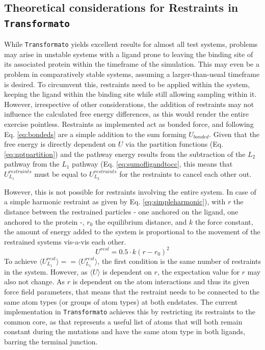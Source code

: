 \documentclass[oneside]{scrreprt}
\begin{document}
\subsection{Theoretical considerations for Restraints in \texttt{Transformato}}
While \texttt{Transformato} yields excellent results for almost all test systems, problems may arise in unstable systems with a ligand prone to leaving the binding site of its associated protein within the timeframe of the simulation. This may even be a problem in comparatively stable systems, assuming a larger-than-usual timeframe is desired. To circumvent this, restraints need to be applied within the system, keeping the ligand within the binding site while still allowing sampling within it. However, irrespective of other considerations, the addition of restraints may not influence the calculated free energy differences, as this would render the entire exercise pointless. Restraints as implemented act as bonded force, and following Eq. \ref{eq:bondeds} are a simple addition to the sum forming $U_{bonded}$. Given that the free energy is directly dependent on $U$ via the partition functions (Eq. \ref{eq:nptpartition}) and the pathway energy results from the subtraction of the $L_2$ pathway from the $L_1$ pathway (Eq. \ref{eq:sumofligandtocc}, this means that $U^{restraints}_{L_1}$ must be equal to $U^{restraints}_{L_2}$ for the restraints to cancel each other out.

However, this is not possible for restraints involving the entire system. In case of a simple harmonic restraint as given by Eq. \ref{eq:simpleharmonic}), with $r$ the distance between the restrained particles - one anchored on the ligand, one anchored to the protein -, $r_0$ the equilibrium distance, and $k$ the force constant,  the amount of energy added to the system is proportional to the movement of the restrained systems vis-a-vis each other.
\begin{equation}\label{eq:simpleharmonic}
    U^{rest}=0.5\cdot k(r-r_0)^2 
\end{equation}
To achieve $\langle U^{rest}_{L_1}\rangle == \langle U^{rest}_{L_1}\rangle$, the first condition is the same number of restraints in the system. However, as $\langle U \rangle$ is dependent on $r$, the expectation value for $r$ may also not change. As $r$ is dependent on the atom interactions and thus its given force field parameters, that means that the restraint needs to be connected to the same atom types (or groups of atom types) at both endstates. The current implementation in \texttt{Transformato} achieves this by restricting its restraints to the common core, as that represents a useful list of atoms that will both remain constant during the mutations and have the same atom type in both ligands, barring the terminal junction.
\end{document}
